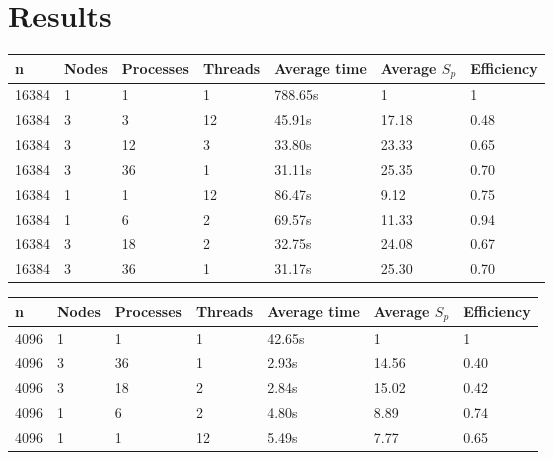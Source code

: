 \section{Results}

\begin{table}[h]
   \centering
    \begin{tabular}{| l | l | l | l | l | l | l |}
    \hline
    \bf{n} & \bf{Nodes} & \bf{Processes} &\bf{Threads} & \bf{Average time} & \bf{Average }$S_{p}$ & \bf{Efficiency} \\ \hline
    	16384 & 1 & 1 & 1 & 788.65s & 1 & 1 \\ \hline
	16384 & 3 & 3 & 12 & 45.91s & 17.18 & 0.48 \\ \hline
	16384 & 3 & 12 & 3 & 33.80s & 23.33 & 0.65 \\ \hline
	16384 & 3 & 36 & 1 & 31.11s & 25.35 & 0.70  \\ \hline
	16384 & 1 & 1 & 12 & 86.47s & 9.12 & 0.75 \\ \hline
	16384 & 1 & 6 & 2 & 69.57s & 11.33 & 0.94 \\ \hline
	16384 & 3 & 18 & 2 & 32.75s & 24.08 & 0.67 \\ \hline
	16384 & 3 & 36 & 1 & 31.17s & 25.30 & 0.70\\ \hline
    \end{tabular}
\end{table}

\begin{table}[h]
   \centering
    \begin{tabular}{| l | l | l | l | l | l | l |}
    \hline
    \bf{n} & \bf{Nodes} & \bf{Processes} &\bf{Threads} & \bf{Average time} & \bf{Average }$S_{p}$ & \bf{Efficiency} \\ \hline
	4096 & 1 & 1 & 1 & 42.65s & 1 & 1 \\ \hline
	4096 & 3 & 36 & 1 & 2.93s & 14.56 & 0.40 \\ \hline
	4096 & 3 & 18 & 2 & 2.84s & 15.02 & 0.42 \\ \hline
	4096 & 1 & 6 & 2 & 4.80s & 8.89 & 0.74 \\ \hline
	4096 & 1 & 1 & 12 & 5.49s & 7.77 & 0.65  \\ \hline
    \end{tabular}
\end{table}